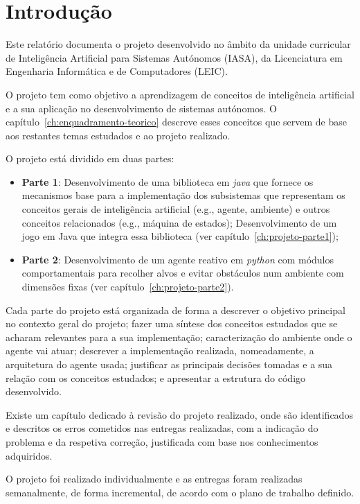 \chapter{Introdução}\label{ch:introducao}

Este relatório documenta o projeto desenvolvido no âmbito da unidade curricular de Inteligência Artificial para Sistemas Autónomos (IASA), da Licenciatura em Engenharia Informática e de Computadores (LEIC).

O projeto tem como objetivo a aprendizagem de conceitos de inteligência artificial e a sua aplicação no desenvolvimento de sistemas autónomos.
O capítulo~\ref{ch:enquadramento-teorico} descreve esses conceitos que servem de base aos restantes temas estudados e ao projeto realizado.

O projeto está dividido em duas partes:
\begin{itemize}
    \item \textbf{Parte 1}: Desenvolvimento de uma biblioteca em \textit{java} que fornece os mecanismos base para a implementação dos subsistemas que representam os conceitos gerais de inteligência artificial (e.g., agente, ambiente) e outros conceitos relacionados (e.g., máquina de estados); Desenvolvimento de um jogo em Java que integra essa biblioteca (ver capítulo~\ref{ch:projeto-parte1});
    \item \textbf{Parte 2}: Desenvolvimento de um agente reativo em \textit{python} com módulos comportamentais para recolher alvos e evitar obstáculos num ambiente com dimensões fixas (ver capítulo~\ref{ch:projeto-parte2}).
\end{itemize}

Cada parte do projeto está organizada de forma a descrever o objetivo principal no contexto geral do projeto; fazer uma síntese dos conceitos estudados que se acharam relevantes para a sua implementação; caracterização do ambiente onde o agente vai atuar; descrever a implementação realizada, nomeadamente, a arquitetura do agente usada; justificar as principais decisões tomadas e a sua relação com os conceitos estudados; e apresentar a estrutura do código desenvolvido.

Existe um capítulo dedicado à revisão do projeto realizado, onde são identificados e descritos os erros cometidos nas entregas realizadas, com a indicação do problema e da respetiva correção, justificada com base nos conhecimentos adquiridos.

O projeto foi realizado individualmente e as entregas foram realizadas semanalmente, de forma incremental, de acordo com o plano de trabalho definido.

